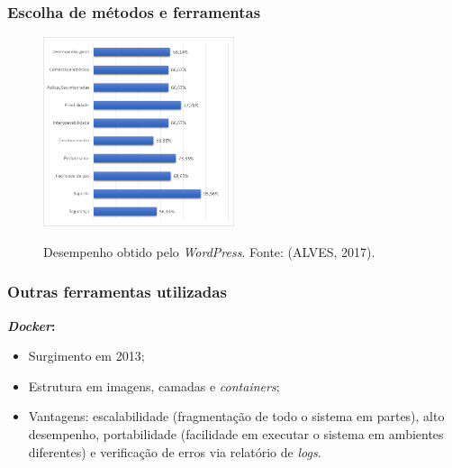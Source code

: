 \documentclass{beamer}
\begin{document}

\begin{frame}
    \frametitle{Escolha de métodos e ferramentas}
    
    \begin{figure}[htb]
        \centering
        \caption{Desempenho obtido pelo \textit{WordPress}. Fonte: (ALVES, 2017).}
        \includegraphics[width=0.5\textwidth]{../figuras/desempenho-wordpress}
        \label{wordpress}
    \end{figure}
        
\end{frame}


\begin{frame}
    \frametitle{Outras ferramentas utilizadas}
    \textbf{\textit{Docker}:} 
    \begin{itemize}
        \item Surgimento em 2013;
        \item Estrutura em imagens, camadas e \textit{containers};
        \item Vantagens: escalabilidade (fragmentação de todo o sistema em partes), alto desempenho, portabilidade (facilidade em executar o sistema em ambientes diferentes) e verificação de erros via relatório de \textit{logs}. 
        
% 
% 

    \end{itemize}
    
\end{frame}
\end{document}
